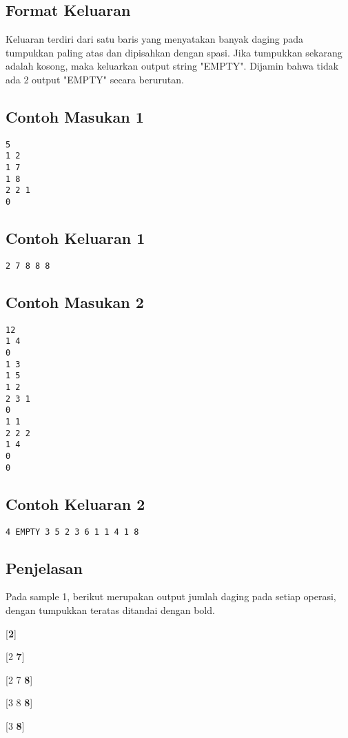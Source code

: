 \documentclass{article}
\begin{document}
\subsection*{Format Keluaran}
Keluaran terdiri dari satu baris yang menyatakan banyak daging pada tumpukkan paling atas dan dipisahkan dengan spasi. Jika tumpukkan sekarang adalah kosong, maka keluarkan output string "EMPTY".  Dijamin bahwa tidak ada 2 output "EMPTY" secara berurutan.

\linebreak
\begin{multicols}{2}
\subsection*{Contoh Masukan 1}
\begin{lstlisting}
5
1 2
1 7 
1 8 
2 2 1
0
\end{lstlisting}
\null
\columnbreak
\subsection*{Contoh Keluaran 1}
\begin{lstlisting}
2 7 8 8 8
\end{lstlisting}
\vfill
\null
\end{multicols}

\pagebreak

\begin{multicols}{2}
\subsection*{Contoh Masukan 2}
\begin{lstlisting}
12
1 4
0
1 3
1 5
1 2
2 3 1
0
1 1
2 2 2
1 4
0
0
\end{lstlisting}
\null
\columnbreak
\subsection*{Contoh Keluaran 2}
\begin{lstlisting}
4 EMPTY 3 5 2 3 6 1 1 4 1 8
\end{lstlisting}
\vfill
\null
\end{multicols}
\subsection*{Penjelasan}
Pada sample 1, berikut merupakan output jumlah daging pada setiap operasi, dengan tumpukkan teratas ditandai dengan bold.

[\textbf{2}]  

[2 \textbf{7}]

[2 7 \textbf{8}]

[3 8 \textbf{8}]

[3 \textbf{8}]
\end{document}
